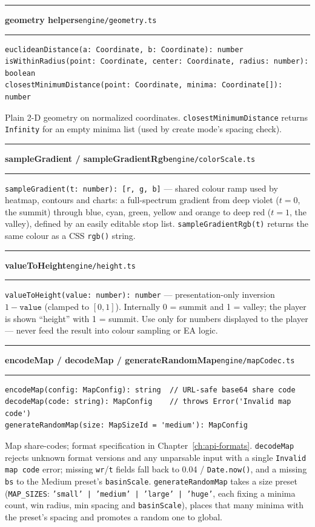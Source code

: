 \documentclass[11pt,a4paper]{report}
\newcommand{\srcfile}[1]{\texttt{\small #1}}   %
\newcommand{\ts}[1]{\texttt{#1}}               %
\newenvironment{apientry}[2]{%
  \par\medskip\noindent
  \begin{minipage}{\textwidth}
  \hrule\vspace{0.6ex}
  {\large\ttfamily\bfseries #1}\hfill{\footnotesize\srcfile{#2}}
  \vspace{0.4ex}\hrule\medskip
}{%
  \end{minipage}\par\medskip
}
\begin{document}
\begin{apientry}{geometry helpers}{engine/geometry.ts}
\begin{lstlisting}
euclideanDistance(a: Coordinate, b: Coordinate): number
isWithinRadius(point: Coordinate, center: Coordinate, radius: number): boolean
closestMinimumDistance(point: Coordinate, minima: Coordinate[]): number
\end{lstlisting}
Plain 2-D geometry on normalized coordinates. \ts{closestMinimumDistance}
returns \ts{Infinity} for an empty minima list (used by create mode's
spacing check).
\end{apientry}

\begin{apientry}{sampleGradient / sampleGradientRgb}{engine/colorScale.ts}
\ts{sampleGradient(t: number): [r, g, b]} --- shared colour ramp used by
heatmap, contours and charts: a full-spectrum gradient from deep violet
($t = 0$, the summit) through blue, cyan, green, yellow and orange to deep
red ($t = 1$, the valley), defined by an easily editable stop list.
\ts{sampleGradientRgb(t)} returns the same colour as a CSS
\ts{rgb()} string.
\end{apientry}

\begin{apientry}{valueToHeight}{engine/height.ts}
\ts{valueToHeight(value: number): number} --- presentation-only inversion
$1 - \ts{value}$ (clamped to $[0,1]$). Internally 0 = summit and 1 =
valley; the player is shown ``height'' with 1 = summit. Use only for
numbers displayed to the player --- never feed the result into colour
sampling or EA logic.
\end{apientry}

\begin{apientry}{encodeMap / decodeMap / generateRandomMap}{engine/mapCodec.ts}
\begin{lstlisting}
encodeMap(config: MapConfig): string  // URL-safe base64 share code
decodeMap(code: string): MapConfig    // throws Error('Invalid map code')
generateRandomMap(size: MapSizeId = 'medium'): MapConfig
\end{lstlisting}
Map share-codes; format specification in Chapter~\ref{ch:api-formats}.
\ts{decodeMap} rejects unknown format versions and any unparsable input
with a single \ts{Invalid map code} error; missing \ts{wr}/\ts{t} fields
fall back to 0.04 / \ts{Date.now()}, and a missing \ts{bs} to the Medium
preset's \ts{basinScale}. \ts{generateRandomMap} takes a size preset
(\ts{MAP\_SIZES}: \ts{'small' | 'medium' | 'large' | 'huge'}, each fixing a
minima count, win radius, min spacing and \ts{basinScale}), places that
many minima with the preset's spacing and promotes a random one to global.
\end{apientry}
\end{document}
